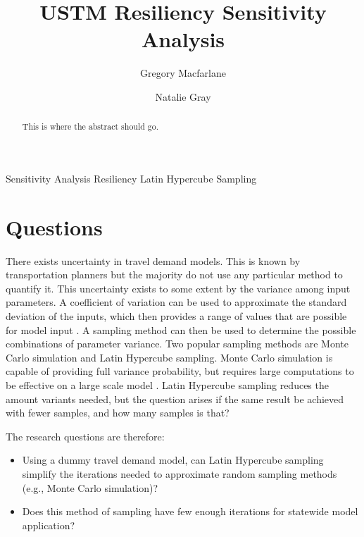 \documentclass[3p, authoryear, review]{elsarticle} %
\providecommand{\tightlist}{%
  \setlength{\itemsep}{0pt}\setlength{\parskip}{0pt}}
\begin{document}
\begin{frontmatter}

  \title{USTM Resiliency Sensitivity Analysis}
    \author[Brigham Young University]{Gregory Macfarlane}
    \author[Brigham Young University]{Natalie Gray}
      \address[Brigham Young University]{Civil and Environmental Engineering Department, 430 Engineering Building, Provo, Utah 84602}
  
  \begin{abstract}
  This is where the abstract should go.
  \end{abstract}
   \begin{keyword} Sensitivity Analysis Resiliency Latin Hypercube Sampling\end{keyword}
 \end{frontmatter}

\hypertarget{questions}{%
\section{Questions}\label{questions}}

There exists uncertainty in travel demand models. This is known by transportation planners but the majority do not use any particular method to quantify it. This uncertainty exists to some extent by the variance among input parameters. A coefficient of variation can be used to approximate the standard deviation of the inputs, which then provides a range of values that are possible for model input \citep{zhao2002propagation}. A sampling method can then be used to determine the possible combinations of parameter variance. Two popular sampling methods are Monte Carlo simulation and Latin Hypercube sampling. Monte Carlo simulation is capable of providing full variance probability, but requires large computations to be effective on a large scale model \citep{yang2013sensitivity}. Latin Hypercube sampling reduces the amount variants needed, but the question arises if the same result be achieved with fewer samples, and how many samples is that?

The research questions are therefore:

\begin{itemize}
\tightlist
\item
  Using a dummy travel demand model, can Latin Hypercube sampling simplify the iterations needed to approximate random sampling methods (e.g., Monte Carlo simulation)?
\item
  Does this method of sampling have few enough iterations for statewide model application?
\end{itemize}
\end{document}

